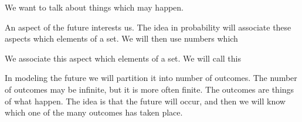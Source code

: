 
\sbasic


\sstart
{}


We want to talk about
things which may happen.


An aspect of the future
interests us. The idea
in probability will associate
these aspects which elements
of a set.
We will then use numbers which

We associate
this aspect which elements
of a set.
We will call this

In modeling the future we will partition it
into number of outcomes. The number of outcomes
may be infinite, but it is more often finite.
The outcomes are things of what happen. The idea
is that the future will occur, and then we will
know which one of the many outcomes has taken place.
\strats
